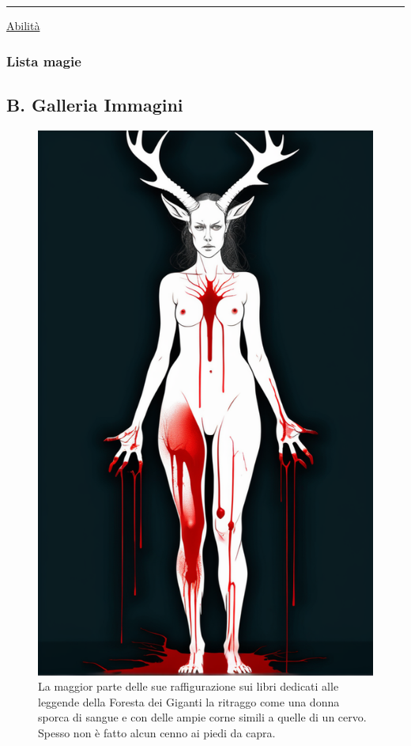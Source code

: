 \begin{center}\rule{0.5\linewidth}{0.5pt}\end{center}

\href{Abilita\%CC\%80\%2047ae4f9c53dd4179b08562154b33a396.csv}{Abilità}

\subsubsection{Lista magie}\label{lista-magie}

\subsection{B. Galleria Immagini}\label{b.-galleria-immagini}

\begin{figure}
\centering
\includegraphics{young-woman-with-blood-on-her-skin-she-is-naked-has-legs-like-a-goat-and-horns-like-an-elk-sf-in_(1).png}
\caption{La maggior parte delle sue raffigurazione sui libri dedicati
alle leggende della Foresta dei Giganti la ritraggo come una donna
sporca di sangue e con delle ampie corne simili a quelle di un cervo.
Spesso non è fatto alcun cenno ai piedi da capra.}
\end{figure}

